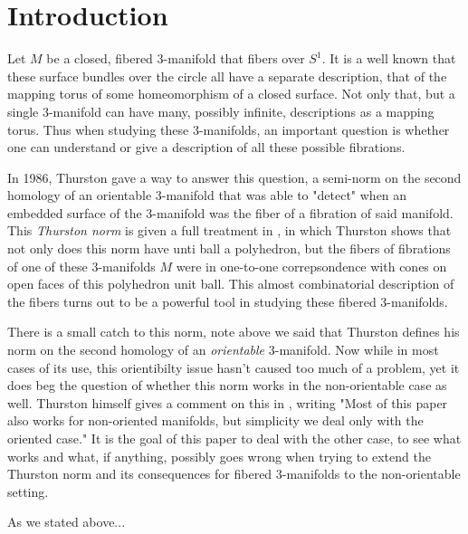\section{Introduction}

Let $M$ be a closed, fibered 3-manifold that fibers over $S^1$. It is a well known that these surface bundles over the circle all have a separate description, that of the mapping torus of some homeomorphism of a closed surface. Not only that, but a single 3-manifold can have many, possibly infinite, descriptions as a mapping torus. Thus when studying these 3-manifolds, an important question is whether one can understand or give a description of all these possible fibrations. 

In 1986, Thurston gave a way to answer this question, a semi-norm on the second homology of an orientable 3-manifold that was able to "detect" when an embedded surface of the 3-manifold was the fiber of a fibration of said manifold. This \textit{Thurston norm} is given a full treatment in \cite{thurston1986norm}, in which Thurston shows that not only does this norm have unti ball a polyhedron, but the fibers of fibrations of one of these 3-manifolds $M$ were in one-to-one correpsondence with cones on open faces of this polyhedron unit ball. This almost combinatorial description of the fibers turns out to be a powerful tool in studying these fibered 3-manifolds.

There is a small catch to this norm, note above we said that Thurston defines his norm on the second homology of an \textit{orientable} 3-manifold. Now while in most cases of its use, this orientibilty issue hasn't caused too much of a problem, yet it does beg the question of whether this norm works in the non-orientable case as well. Thurston himself gives a comment on this in \cite{thurston1986norm}, writing "Most of this paper also works for non-oriented manifolds, but simplicity we deal only with the oriented case." It is the goal of this paper to deal with the other case, to see what works and what, if anything, possibly goes wrong when trying to extend the Thurston norm and its consequences for fibered 3-manifolds to the non-orientable setting. 

As we stated above...
